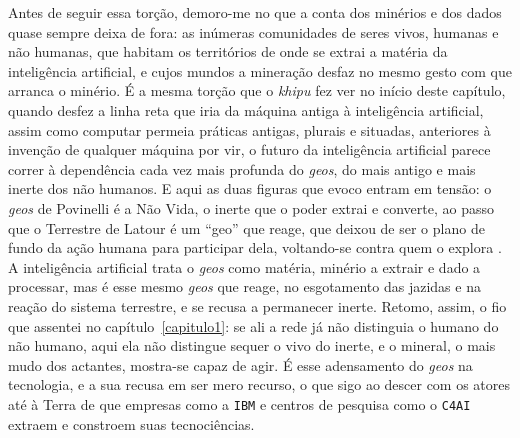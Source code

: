 Antes de seguir essa torção, demoro-me no que a conta dos minérios e dos dados quase sempre deixa de fora: as inúmeras comunidades de seres vivos, humanas e não humanas, que habitam os territórios de onde se extrai a matéria da inteligência artificial, e cujos mundos a mineração desfaz no mesmo gesto com que arranca o minério. É a mesma torção que o \textit{khipu} fez ver no início deste capítulo, quando desfez a linha reta que iria da máquina antiga à inteligência artificial, assim como computar permeia práticas antigas, plurais e situadas, anteriores à invenção de qualquer máquina por vir, o futuro da inteligência artificial parece correr à dependência cada vez mais profunda do \textit{geos}, do mais antigo e mais inerte dos não humanos. E aqui as duas figuras que evoco entram em tensão: o \textit{geos} de Povinelli é a Não Vida, o inerte que o poder extrai e converte, ao passo que o Terrestre de Latour é um \enquote{geo} que reage, que deixou de ser o plano de fundo da ação humana para participar dela, voltando-se contra quem o explora \parencite{Latour2020Gaia}. A inteligência artificial trata o \textit{geos} como matéria, minério a extrair e dado a processar, mas é esse mesmo \textit{geos} que reage, no esgotamento das jazidas e na reação do sistema terrestre, e se recusa a permanecer inerte. Retomo, assim, o fio que assentei no capítulo~\ref{capitulo1}: se ali a rede já não distinguia o humano do não humano, aqui ela não distingue sequer o vivo do inerte, e o mineral, o mais mudo dos actantes, mostra-se capaz de agir. É esse adensamento do \textit{geos} na tecnologia, e a sua recusa em ser mero recurso, o que sigo ao descer com os atores até à Terra de que empresas como a \texttt{IBM} e centros de pesquisa como o \texttt{C4AI} extraem e constroem suas tecnociências. 

